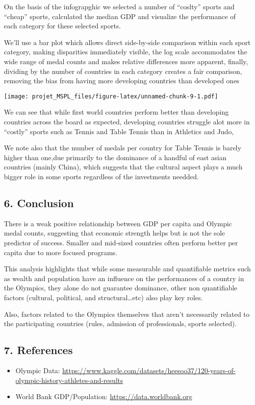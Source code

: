 \documentclass[
]{article}
\providecommand{\tightlist}{%
  \setlength{\itemsep}{0pt}\setlength{\parskip}{0pt}}
\begin{document}
On the basis of the infograpghic we selected a number of ``coslty''
sports and ``cheap'' sports, calculated the median GDP and visualize the
performance of each category for these selected sports.

We'll use a bar plot which allows direct side-by-side comparison within
each sport category, making disparities immediately visible, the log
scale accommodates the wide range of medal counts and makes relative
differences more apparent, finally, dividing by the number of countries
in each category creates a fair comparison, removing the bias from
having more developing countries than developed ones

\texttt{[image: projet\_MSPL\_files/figure-latex/unnamed-chunk-9-1.pdf]}

We can see that while first world countries perform better than
developing countries across the board as expected, developing countries
struggle alot more in ``costly'' sports such as Tennis and Table Tennis
than in Athletics and Judo,

We note also that the number of medals per country for Table Tennis is
barely higher than one,due primarily to the dominance of a handful of
east asian countries (mainly China), which suggests that the cultural
aspect plays a much bigger role in some sports regardless of the
investments needded.

\subsection{6. Conclusion}\label{conclusion}

There is a weak positive relationship between GDP per capita and Olympic
medal counts, suggesting that economic strength helps but is not the
sole predictor of success. Smaller and mid-sized countries often perform
better per capita due to more focused programs.

This analysis highlights that while some measurable and quantifiable
metrics such as wealth and population have an influence on the
performances of a country in the Olympics, they alone do not guarantee
dominance, other non quantifiable factors (cultural, political, and
structural\ldots etc) also play key roles.

Also, factors related to the Olympics themselves that aren't necessarily
related to the participating countries (rules, admission of
professionals, sports selected).

\subsection{7. References}\label{references}

\begin{itemize}
\tightlist
\item
  Olympic Data:
  \url{https://www.kaggle.com/datasets/heesoo37/120-years-of-olympic-history-athletes-and-results}
\item
  World Bank GDP/Population: \url{https://data.worldbank.org}
\end{itemize}
\end{document}
